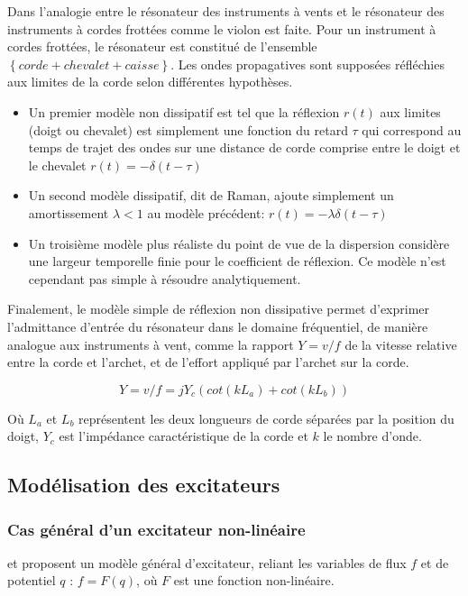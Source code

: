 \documentclass[atiam, article]{rapport} %
\begin{document}
Dans \cite{ollivier_idealized_2004} l'analogie entre le résonateur des instruments à vents et le résonateur des instruments à cordes frottées comme le violon est faite. Pour un instrument à cordes frottées, le résonateur est constitué de l'ensemble $\left\{ corde + chevalet + caisse\right\}$. Les ondes propagatives sont supposées réfléchies aux limites de la corde selon différentes hypothèses.

\begin{itemize}
  \item Un premier modèle non dissipatif est tel que la réflexion $r(t)$ aux limites (doigt ou chevalet) est simplement une fonction du retard $\tau$ qui correspond au temps de trajet des ondes sur une distance de corde comprise entre le doigt et le chevalet $r(t)=-\delta(t-\tau)$
  \item Un second modèle dissipatif, dit de Raman, ajoute simplement un amortissement $\lambda < 1$ au modèle précédent: $r(t)=-\lambda \delta(t-\tau)$
  \item Un troisième modèle plus réaliste du point de vue de la dispersion  considère une largeur temporelle finie pour le coefficient de réflexion. Ce modèle n'est cependant pas simple à résoudre analytiquement.
\end{itemize}

Finalement, le modèle simple de réflexion non dissipative permet d'exprimer l'admittance d'entrée du résonateur dans le domaine fréquentiel, de manière analogue aux instruments à vent, comme la rapport $Y=v/f$ de la vitesse relative entre la corde et l'archet, et de l'effort appliqué par l'archet sur la corde.

$$Y=v/f=jY_c(cot(kL_a)+cot(kL_b))$$

Où $L_a$ et $L_b$ représentent les deux longueurs de corde séparées par la position du doigt, $Y_c$ est l'impédance caractéristique de la corde et $k$ le nombre d'onde.


\subsection{Modélisation des excitateurs}

\subsubsection{Cas général d'un excitateur non-linéaire}\label{subsubsection:excitateur_cas_général}

\cite{mcintyre_oscillations_1983} et \cite{maganza_bifurcations_1986} proposent un modèle général d'excitateur, reliant les variables de flux $f$ et de potentiel $q$ : $f=F(q)$, où $F$ est une fonction non-linéaire.
\end{document}
